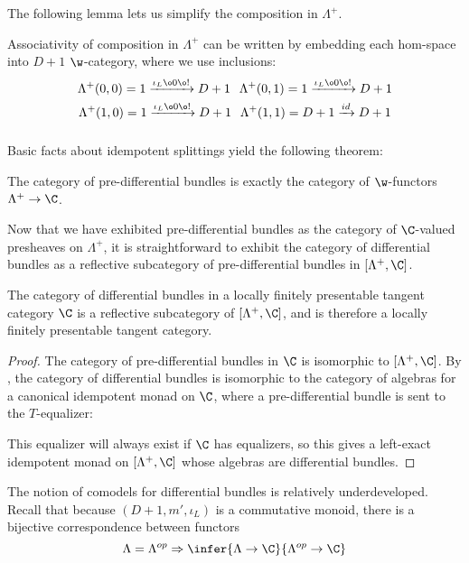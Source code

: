 The following lemma lets us simplify the composition in $\Lambda^+$.
\begin{lemma}
	Associativity of composition in $\Lambda^+$ can be written by embedding each hom-space into $D+1$
	$\w$-category, where we use inclusions:
	\begin{gather*}
		\Lambda^+(0,0) = 1 \xrightarrow{\iota_L \o 0 \o !} D+1  \hspace{0.25cm}
		\Lambda^+(0,1) = 1 \xrightarrow{\iota_L \o 0 \o !} D+1  \\
		\Lambda^+(1,0) = 1 \xrightarrow{\iota_L \o 0 \o !} D+1  \hspace{0.25cm}
		\Lambda^+(1,1) = D+1 \xrightarrow{id} D+1  
	\end{gather*}
    \[\]
\end{lemma}
Basic facts about idempotent splittings yield the following theorem:
\begin{lemma}
	The category of pre-differential bundles is exactly the category of $\w$-functors $\Lambda^+ \to \C$. 
\end{lemma}
Now that we have exhibited pre-differential bundles as the category of $\C$-valued presheaves on $\Lambda^+$, it is straightforward to exhibit the category of differential bundles as a reflective subcategory of pre-differential bundles in $[\Lambda^+, \C]$.
\begin{proposition}
    The category of differential bundles in a locally finitely presentable tangent category $\C$ is a reflective subcategory of $[\Lambda^+, \C]$, and is therefore a locally finitely presentable tangent category.
\end{proposition}
\begin{proof}
    The category of pre-differential bundles in $\C$ is isomorphic to $[\Lambda^+, \C]$. 
    By , the category of differential bundles is isomorphic to the category of algebras for a canonical idempotent monad on $\C$, where a pre-differential bundle is sent to the $T$-equalizer: 
    
    This equalizer will always exist if $\C$ has equalizers, so this gives a left-exact idempotent monad on $[\Lambda^+, \C]$ whose algebras are differential bundles. 
\end{proof}
The notion of comodels for differential bundles is relatively underdeveloped.
Recall that because $(D+1, m', \iota_L)$ is a commutative monoid, there is a bijective correspondence between functors
\[
	\Lambda = \Lambda^{op} \Rightarrow \infer{\Lambda \to \C}{\Lambda^{op} \to \C}
\]
